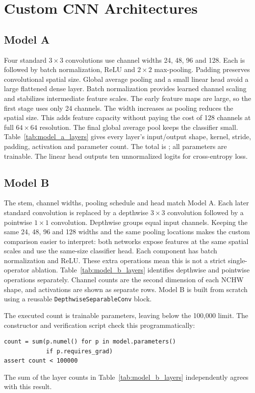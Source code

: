 \section{Custom CNN Architectures}
\subsection{Model A}
Four standard $3\times3$ convolutions use channel widths 24, 48, 96 and 128.
Each is followed by batch normalization, ReLU and $2\times2$ max-pooling.
Padding preserves convolutional spatial size. Global average pooling and a
small linear head avoid a large flattened dense layer. Batch normalization
provides learned channel scaling and stabilizes intermediate feature scales.
The early feature maps are large, so the first stage uses only 24 channels.
The width increases as pooling reduces the spatial size. This adds feature
capacity without paying the cost of 128 channels at full $64\times64$
resolution. The final global average pool keeps the classifier small.
Table~\ref{tab:model_a_layers} gives every layer's input/output shape, kernel,
stride, padding, activation and parameter count. The total is \AParams{};
all parameters are trainable. The linear head outputs ten unnormalized logits
for cross-entropy loss.

\subsection{Model B}
The stem, channel widths, pooling schedule and head match Model A. Each later
standard convolution is replaced by a depthwise $3\times3$ convolution followed
by a pointwise $1\times1$ convolution. Depthwise groups equal input channels.
Keeping the same 24, 48, 96 and 128 widths and the same pooling locations makes
the custom comparison easier to interpret: both networks expose features at
the same spatial scales and use the same-size classifier head.
Each component has batch normalization and ReLU. These extra operations mean
this is not a strict single-operator ablation. Table~\ref{tab:model_b_layers}
identifies depthwise and pointwise operations separately. Channel counts are
the second dimension of each NCHW shape, and activations are shown as separate
rows. Model B is built from scratch using a reusable
\texttt{DepthwiseSeparableConv} block.

The executed count is \BParams{} trainable parameters, leaving
\BMargin{} below the 100,000 limit. The constructor and verification script
check this programmatically:
\begin{verbatim}
count = sum(p.numel() for p in model.parameters()
            if p.requires_grad)
assert count < 100000
\end{verbatim}
The sum of the layer counts in Table~\ref{tab:model_b_layers} independently
agrees with this result.

